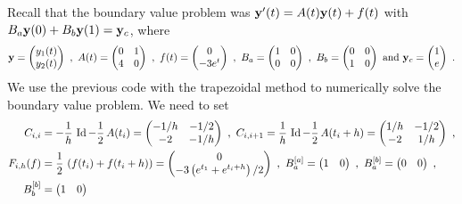 \begin{egg}
Recall that the boundary value problem was
$\mathbf{y}'(t) = A(t) \mathbf{y}(t) + f(t)$ with
$B_a \mathbf{y}(0) + B_b\mathbf{y}(1) = \mathbf{y}_c$, where
\[
\VEC{y} = \begin{pmatrix} y_1(t) \\ y_2(t) \end{pmatrix} \ ,
\ A(t) = \begin{pmatrix} 0 & 1 \\ 4 & 0 \end{pmatrix} \ ,
\ f(t) = \begin{pmatrix} 0 \\ -3 e^t \end{pmatrix} \ ,
\ B_a = \begin{pmatrix} 1 & 0 \\  0 & 0 \end{pmatrix} \ ,
\ B_b = \begin{pmatrix} 0 & 0 \\ 1 & 0 \end{pmatrix} \ \text{and}
\ \VEC{y}_c = \begin{pmatrix} 1 \\ e \end{pmatrix} \ .
\]
We use the previous code with the trapezoidal method to numerically
solve the boundary value problem.  We need to set
\begin{align*}
C_{i,i} &=  -\frac{1}{h}\,\Id -\frac{1}{2}\,A(t_i)
= \begin{pmatrix} -1/h & -1/2 \\ -2 & -1/h \end{pmatrix} \ ,
\ C_{i,i+1} = \frac{1}{h}\,\Id -\frac{1}{2}\,A(t_i+h)
= \begin{pmatrix} 1/h & -1/2 \\ -2 & 1/h \end{pmatrix} \ , \\
F_{i,h}(f) &= \frac{1}{2}\,\left( f(t_i) + f(t_i+h) \right)
= \begin{pmatrix} 0 \\ -3 \left(e^{t_1} + e^{t_i+h}\right)/2 \end{pmatrix} \ ,
\ B_a^{[a]} = \begin{pmatrix} 1 & 0 \end{pmatrix} \ ,
\ B_a^{[b]} = \begin{pmatrix} 0 & 0 \end{pmatrix} \ , \\
B_b^{[b]} &= \begin{pmatrix} 1 & 0 \end{pmatrix}

\end{align*}
\end{egg}
